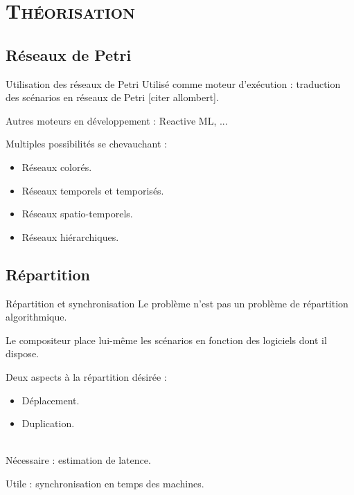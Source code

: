 
\section{\scshape Théorisation}
\subsection{Réseaux de Petri}
\begin{frame}{Utilisation des réseaux de Petri}
Utilisé comme moteur d'exécution : traduction des scénarios en réseaux de Petri [citer allombert].

Autres moteurs en développement : Reactive ML, ...

Multiples possibilités se chevauchant :
\begin{itemize}
	\item Réseaux colorés.
	\item Réseaux temporels et temporisés.
	\item Réseaux spatio-temporels.
	\item Réseaux hiérarchiques.
\end{itemize}

\end{frame}


\subsection{Répartition}
\begin{frame}{Répartition et synchronisation}
	Le problème n'est pas un problème de répartition algorithmique.
	\begin{itemize}
		\itemar Le compositeur place lui-même les scénarios en fonction des logiciels dont il dispose.
	\end{itemize}
	
	Deux aspects à la répartition désirée : 
	\begin{itemize}
		\item Déplacement.
		\item Duplication. 
	\end{itemize}
	~ \\
	Nécessaire : estimation de latence.
	
	Utile : synchronisation en temps des machines.
	\begin{itemize}
	\end{itemize}
\end{frame}
